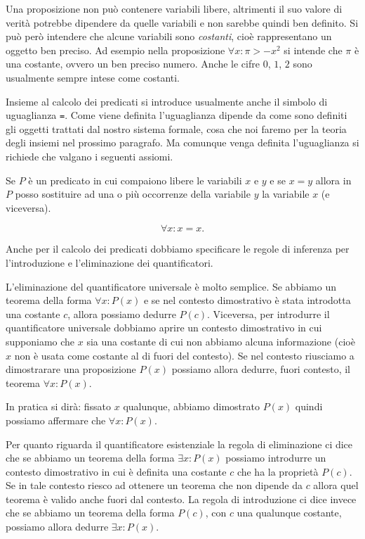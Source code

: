 Una proposizione non può contenere variabili libere, 
altrimenti il suo valore di verità potrebbe dipendere da quelle 
variabili e non sarebbe quindi ben definito.
%
%
Si può però intendere che alcune variabili sono \emph{costanti},
cioè rappresentano un oggetto ben preciso.
Ad esempio nella proposizione $\forall x: \pi > -x^2$ si intende 
che $\pi$ è una costante, ovvero un ben preciso numero.
Anche le cifre $0$, $1$, $2$ sono usualmente sempre intese come
costanti.

Insieme al calcolo dei predicati si introduce usualmente anche il simbolo di uguaglianza \texttt{=}.
Come viene definita l'uguaglianza dipende da come sono definiti gli oggetti trattati 
dal nostro sistema formale, cosa che noi faremo per la teoria degli insiemi nel prossimo paragrafo.
Ma comunque venga definita l'uguaglianza si richiede che valgano i seguenti
assiomi.

\begin{axiom}[estensionalità]
Se $P$ è un predicato in cui compaiono libere le variabili
$x$ e $y$ e se $x=y$ allora in $P$ posso sostituire 
ad una o più occorrenze della variabile $y$ la variabile 
$x$ (e viceversa).
\end{axiom}

\begin{axiom}[uguaglianza]
\[
  \forall x\colon x=x.  
\]
\end{axiom}

Anche per il calcolo dei predicati dobbiamo specificare le regole 
di inferenza per l'introduzione e l'eliminazione dei quantificatori.

%
%
L'eliminazione del quantificatore universale è molto semplice. 
Se abbiamo un teorema della forma $\forall x\colon P(x)$
e se nel contesto dimostrativo è stata introdotta una costante 
$c$, allora possiamo dedurre $P(c)$.
%
Viceversa, per introdurre il quantificatore universale 
dobbiamo aprire un contesto dimostrativo in cui supponiamo 
che $x$ sia una costante di cui non abbiamo alcuna informazione 
(cioè $x$ non è usata come costante al di fuori del contesto).
Se nel contesto riusciamo a dimostrarare una proposizione $P(x)$ possiamo 
allora dedurre, fuori contesto, il teorema $\forall x\colon P(x)$.

In pratica si dirà: fissato $x$ qualunque, abbiamo dimostrato $P(x)$
quindi possiamo affermare che $\forall x\colon P(x)$.

%
%
Per quanto riguarda il quantificatore esistenziale la regola 
di eliminazione ci dice che se abbiamo un teorema della forma 
$\exists x\colon P(x)$ possiamo introdurre un contesto dimostrativo 
in cui è definita una costante $c$ che ha la proprietà $P(c)$.
Se in tale contesto riesco ad ottenere un teorema che non dipende 
da $c$ allora quel teorema è valido anche fuori dal contesto.
%
La regola di introduzione ci dice invece che
se abbiamo un teorema della forma $P(c)$,
con $c$ una qualunque costante,
possiamo allora dedurre $\exists x\colon P(x)$.

